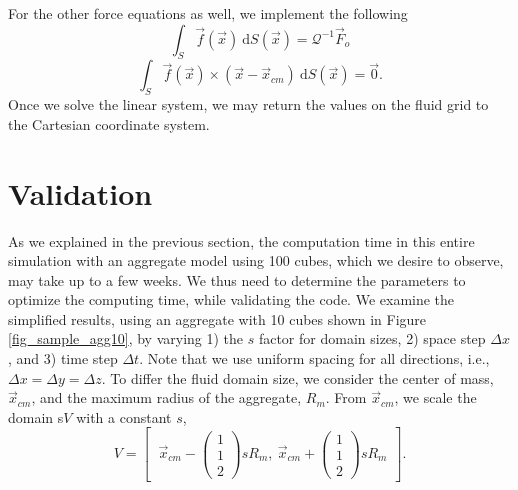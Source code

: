 For the other force equations as well, we implement the following
\begin{equation}
	\int_{S} \vec{f}(\vec{x}) \  \text{d}S(\vec{x})
	= \mathcal{Q}^{-1} \vec{F}_o
	 \label{eq_drag_code}
	 \end{equation} 
	 \begin{equation}
		 \int_S \vec{f} (\vec{x})  \times (\vec{x} - \vec{x}_{cm}) 
		 \ \textrm{d}S(\vec{x}) 
		 = \vec{0}.
	 \label{eq_torque_code}
	 \end{equation}
Once we solve the linear system, we may return the values on the fluid grid to the Cartesian coordinate system.



\section{Validation}
As we explained in the previous section, the computation time in this entire simulation with an aggregate model using 100 cubes, which we desire to observe, may take up to a few weeks. We thus need to determine the parameters to optimize the computing time, while validating the code. We examine the simplified results, using an aggregate with 10 cubes shown in Figure \ref{fig_sample_agg10}, by varying 1) the $s$ factor for domain sizes, 2) space step $\Delta x$, and 3) time step  $\Delta t$. Note that we use uniform spacing for all directions, i.e., $\Delta x = \Delta y = \Delta z$. To differ the fluid domain size, we consider the center of mass,  $\vec{x}_{cm}$, and the maximum radius of the aggregate, $R_m$.
From $\vec{x}_{cm}$, we scale the domain s$V$ with a constant $s$,
\[
	V = 
	\begin{bmatrix}
	 \ \vec{x}_{cm} - \begin{pmatrix}
		1 \\ 1 \\ 2
		\end{pmatrix} s R_m , 
		\ \vec{x}_{cm} + \begin{pmatrix}
			1 \\ 1 \\ 2
			\end{pmatrix} s R_m
	\end{bmatrix}.
\]
